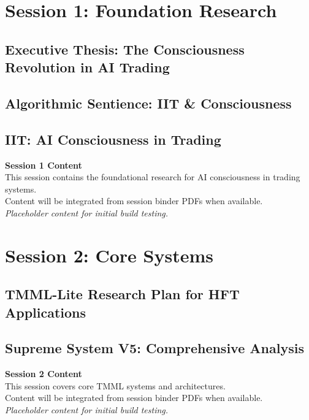 \documentclass[12pt,oneside]{book}
\begin{document}
\part*{Session 1: Foundation Research}
\chapter{Executive Thesis: The Consciousness Revolution in AI Trading}
\chapter{Algorithmic Sentience: IIT \& Consciousness}
\chapter{IIT: AI Consciousness in Trading}

\vspace{2cm}
\begin{center}
{\Large \textbf{Session 1 Content}}\\[12pt]
{\normalsize This session contains the foundational research for AI consciousness in trading systems.}\\
{\normalsize Content will be integrated from session binder PDFs when available.}\\[12pt]
{\itshape Placeholder content for initial build testing.}
\end{center}
\newpage

\part*{Session 2: Core Systems}
\chapter{TMML-Lite Research Plan for HFT Applications}
\chapter{Supreme System V5: Comprehensive Analysis}

\vspace{2cm}
\begin{center}
{\Large \textbf{Session 2 Content}}\\[12pt]
{\normalsize This session covers core TMML systems and architectures.}\\
{\normalsize Content will be integrated from session binder PDFs when available.}\\[12pt]
{\itshape Placeholder content for initial build testing.}
\end{center}
\newpage
\end{document}
